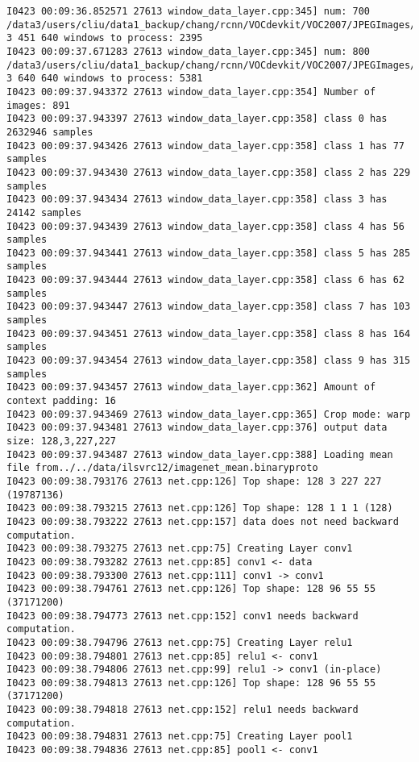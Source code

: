 \documentclass[a4]{article}
\begin{document}
\begin{lstlisting}
I0423 00:09:36.852571 27613 window_data_layer.cpp:345] num: 700 /data3/users/cliu/data1_backup/chang/rcnn/VOCdevkit/VOC2007/JPEGImages/COCO_val2014_000000470553.jpg 3 451 640 windows to process: 2395
I0423 00:09:37.671283 27613 window_data_layer.cpp:345] num: 800 /data3/users/cliu/data1_backup/chang/rcnn/VOCdevkit/VOC2007/JPEGImages/COCO_val2014_000000550400.jpg 3 640 640 windows to process: 5381
I0423 00:09:37.943372 27613 window_data_layer.cpp:354] Number of images: 891
I0423 00:09:37.943397 27613 window_data_layer.cpp:358] class 0 has 2632946 samples
I0423 00:09:37.943426 27613 window_data_layer.cpp:358] class 1 has 77 samples
I0423 00:09:37.943430 27613 window_data_layer.cpp:358] class 2 has 229 samples
I0423 00:09:37.943434 27613 window_data_layer.cpp:358] class 3 has 24142 samples
I0423 00:09:37.943439 27613 window_data_layer.cpp:358] class 4 has 56 samples
I0423 00:09:37.943441 27613 window_data_layer.cpp:358] class 5 has 285 samples
I0423 00:09:37.943444 27613 window_data_layer.cpp:358] class 6 has 62 samples
I0423 00:09:37.943447 27613 window_data_layer.cpp:358] class 7 has 103 samples
I0423 00:09:37.943451 27613 window_data_layer.cpp:358] class 8 has 164 samples
I0423 00:09:37.943454 27613 window_data_layer.cpp:358] class 9 has 315 samples
I0423 00:09:37.943457 27613 window_data_layer.cpp:362] Amount of context padding: 16
I0423 00:09:37.943469 27613 window_data_layer.cpp:365] Crop mode: warp
I0423 00:09:37.943481 27613 window_data_layer.cpp:376] output data size: 128,3,227,227
I0423 00:09:37.943487 27613 window_data_layer.cpp:388] Loading mean file from../../data/ilsvrc12/imagenet_mean.binaryproto
I0423 00:09:38.793176 27613 net.cpp:126] Top shape: 128 3 227 227 (19787136)
I0423 00:09:38.793215 27613 net.cpp:126] Top shape: 128 1 1 1 (128)
I0423 00:09:38.793222 27613 net.cpp:157] data does not need backward computation.
I0423 00:09:38.793275 27613 net.cpp:75] Creating Layer conv1
I0423 00:09:38.793282 27613 net.cpp:85] conv1 <- data
I0423 00:09:38.793300 27613 net.cpp:111] conv1 -> conv1
I0423 00:09:38.794761 27613 net.cpp:126] Top shape: 128 96 55 55 (37171200)
I0423 00:09:38.794773 27613 net.cpp:152] conv1 needs backward computation.
I0423 00:09:38.794796 27613 net.cpp:75] Creating Layer relu1
I0423 00:09:38.794801 27613 net.cpp:85] relu1 <- conv1
I0423 00:09:38.794806 27613 net.cpp:99] relu1 -> conv1 (in-place)
I0423 00:09:38.794813 27613 net.cpp:126] Top shape: 128 96 55 55 (37171200)
I0423 00:09:38.794818 27613 net.cpp:152] relu1 needs backward computation.
I0423 00:09:38.794831 27613 net.cpp:75] Creating Layer pool1
I0423 00:09:38.794836 27613 net.cpp:85] pool1 <- conv1

\end{lstlisting}
\end{document}
